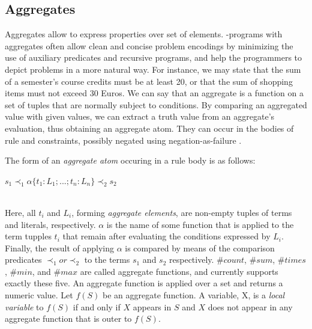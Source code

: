 \documentclass[14pt,a4paper, titlepage]{article}
\begin{document}
\subsection{Aggregates}
Aggregates allow to express properties over set of elements. \hex{}-programs with aggregates often allow clean and concise problem encodings by minimizing the use of auxiliary predicates and recursive programs, and help the programmers to depict problems in a more natural way. For instance, we may state that the sum of a semester's course credits must be at least 20, or that the sum of shopping items must not exceed 30 Euros. We can say that an aggregate is a function on a set of tuples that are normally subject to conditions. By comparing an aggregated value with given values, we can extract a truth value from an aggregate's evaluation, thus obtaining an aggregate atom. They can occur in the bodies of rule and constraints, possibly negated using negation-as-failure \cite{pott}.

The form of an \emph{aggregate atom} occuring in a rule body is as follows:\\ \centerline{$s_1 \prec_1 \alpha \{ t_1:L_1;...;t_n:L_n\} \prec_2 s_2$} 
\\ Here, all $\mathit{t_i}$ and $\mathit{L_i}$, forming \emph{aggregate elements}, are non-empty tuples of terms and literals, respectively. $\alpha$ is the name of some function that is applied to the term tupples \texttt{$t_i$} that remain after evaluating the conditions expressed by $L_i$. Finally,  the result of applying $\alpha$ is compared by means of the comparison predicates $\prec_1 or \prec_2$ to the terms $s_1$ and $s_2$ respectively. $\mathit{\#count}$, $\mathit{\#sum}$, $\mathit{\#times}$, $\mathit{\#min}$, and $\mathit{\#max}$ are called aggregate functions, and \dlvhex{} currently supports exactly these five. An aggregate function is applied over a set and returns a numeric value. Let $f(S)$ be an aggregate function. A variable, X, is a \emph{local variable} to $f(S)$ if and only if $X$ appears in $S$ and $X$ does not appear in any aggregate function that is outer to $f(S)$.
\end{document}
